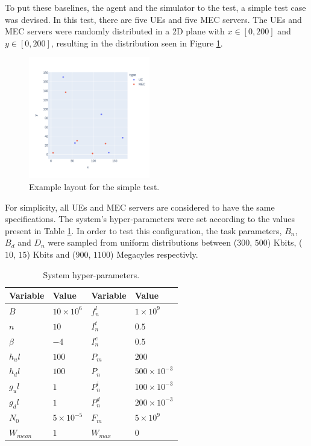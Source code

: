 To put these baselines, the agent and the simulator to the test, a simple test case was devised. In this test, there are five \acrshort{UE}s and five \acrshort{MEC} servers. The UEs and MEC servers were randomly distributed in a 2D plane with $x \in [0, 200]$ and $y \in [0, 200]$, resulting in the distribution seen in Figure \ref{example_layout}.

\begin{figure}[H]
  \centering
  \includegraphics[width=200px]{images/example_layout.png}
  \caption{Example layout for the simple test.}  \label{example_layout}
\end{figure}

For simplicity, all \acrshort{UE}s and \acrshort{MEC} servers are considered to have the same specifications. The system's hyper-parameters were set according to the values present in Table \ref{hyperparams}. In order to test this configuration, the task parameters, $B_n$, $B_d$ and $D_n$ were sampled from uniform distributions between ($300$, $500$) Kbits, ($10$, $15$) Kbits and ($900$, $1100$) Megacyles respectivly. 

\begin{table}[H]
\centering
\begin{tabular}{|l|l|l|l|}
\hline
Variable             & Value & Variable                & Value \\ \hline
$B$&$10\times10^{6}$&$f_n^l$&$1\times10^{9}$\\
$n$&$10$&$I_n^t$&$0.5$\\
$\beta$&$-4$&$I_n^e$&$0.5$\\
$h_ul$&$100$& $P_m$&$200$\\
$h_dl$&$100$& $P_n$& $500\times10^{-3}$\\
$g_ul$&$1$&$P_n^i$&$100\times10^{-3}$\\
$g_dl$&$1$&$P_n^d$&$200\times10^{-3}$\\
$N_0$&$5\times10^{-5}$&$F_m$&$5\times10^{9}$\\
$W_{mean}$&$1$&$W_{max}$&$0$\\ \hline
\end{tabular}
\caption{System hyper-parameters.}\label{hyperparams}
\end{table}


